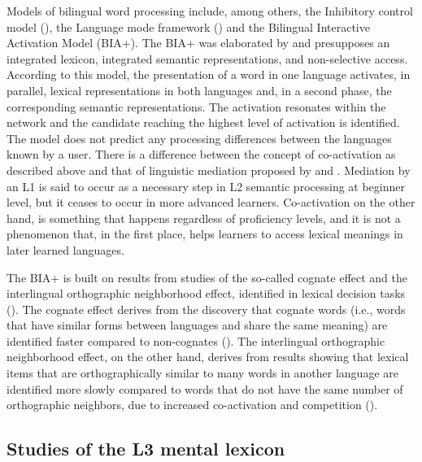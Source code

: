 \documentclass[output=paper,colorlinks,citecolor=brown,nonflat]{langsci/langscibook}
\begin{document}
Models of bilingual word processing include, among others, the Inhibitory control model (\citealt{Green1986, Green1998}), the Language mode framework (\citealt{Grosjean1997, Grosjean2001}) and the Bilingual Interactive Activation Model (BIA+). The BIA+ was elaborated by \citet{DijkstraVanHeuven2002} and presupposes an integrated lexicon, integrated semantic representations, and non-selective access. According to this model, the presentation of a word in one language activates, in parallel, lexical representations in both languages and, in a second phase, the corresponding semantic representations. The activation resonates within the network and the candidate reaching the highest level of activation is identified. The model does not predict any processing differences between the languages known by a user. There is a difference between the concept of co-activation as described above and that of linguistic mediation proposed by \citet{KrollStewart1994} and \citet{FitzpatrickIzura2011}. Mediation by an L1 is said to occur as a necessary step in L2 semantic processing at beginner level, but it ceases to occur in more advanced learners. Co-activation on the other hand, is something that happens regardless of proficiency levels, and it is not a phenomenon that, in the first place, helps learners to access lexical meanings in later learned languages.

The BIA+ is built on results from studies of the so-called cognate effect and the interlingual orthographic neighborhood effect, identified in lexical decision tasks (\citealt{SánchezCasasEtAl1992, LemhöferDijkstra2004, Dijkstra2005}). The cognate effect derives from the discovery that cognate words (i.e., words that have similar forms between languages and share the same meaning) are identified faster compared to non-cognates (\citealt{LemhöferDijkstra2004}). The interlingual orthographic neighborhood effect, on the other hand, derives from results showing that lexical items that are orthographically similar to many words in another language are identified more slowly compared to words that do not have the same number of orthographic neighbors, due to increased co-activation and competition (\citealt{GraingerDijkstra1992, VanHeuvenEtAl1998}).

\subsection{Studies of the L3 mental lexicon}\label{sec:gudmundson:1.2}
\end{document}
